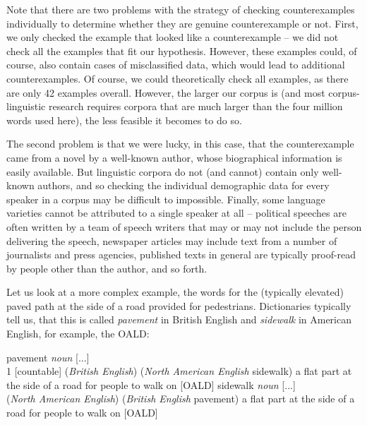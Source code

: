 Note that there are two problems with the strategy of checking counterexamples  individually to determine whether they are genuine counterexample  or not. First, we only checked the example that looked like a counterexample -- we did not check all the examples that fit our hypothesis.  However, these examples could, of course, also contain cases of misclassified data, which would lead to additional counterexamples.  Of course, we could theoretically check all examples, as there are only 42 examples overall. However, the larger  our corpus is (and most corpus\hyp{}linguistic research requires corpora that are much larger  than the four million words used here), the less feasible it becomes to do so.

The second problem is that we were lucky, in this case, that the counterexample  came from a novel  by a well\hyp{}known author, whose biographical information is easily available. But linguistic corpora do not (and cannot) contain only well\hyp{}known authors, and so checking the individual demographic  data for every speaker in a corpus may be difficult to impossible. Finally, some language varieties  cannot be attributed to a single speaker at all -- political speeches are often written by a team of speech writers that may or may not include the person delivering the speech, newspaper  articles may include text from a number of journalists and press agencies, published texts in general are typically proof\hyp{}read by people other than the author, and so forth.

Let us look at a more complex example, the words for the (typically elevated) paved path at the side of a road provided for pedestrians. Dictionaries  typically tell us, that this is called \textit{pavement} in British  English and \textit{sidewalk} in American  English, for example, the OALD:

\begin{exe}
\ex
\begin{xlist}
\label{ex:oaldpavementsidewalk}
\ex pavement \textit{noun} [...] \\
1 [countable] (\textit{British English}) (\textit{North American English} sidewalk) a flat part at the side of a road for people to walk on [OALD]
\ex sidewalk \textit{noun} [...] \\
(\textit{North American English}) (\textit{British English} pavement) a flat part at the side of a road for people to walk on [OALD]
\end{xlist}
\end{exe}


